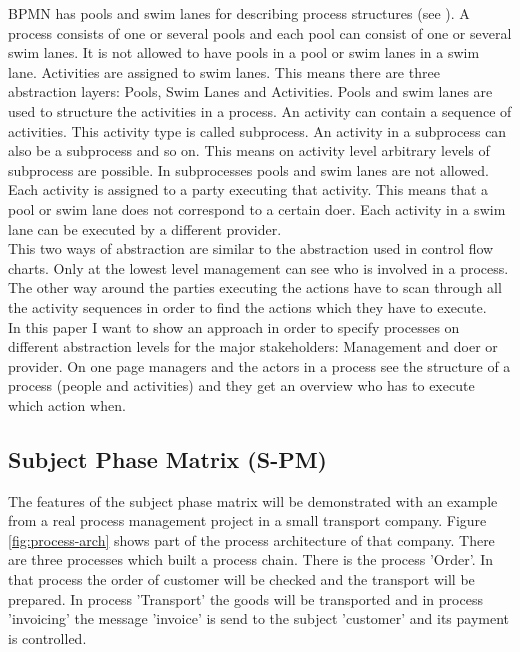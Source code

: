 BPMN has pools and swim lanes for describing process structures (see \cite{Standard:BPMN}). A process consists of one or several pools and each pool can consist of one or several swim lanes. It is not allowed to have pools in a pool or swim lanes in a swim lane. Activities are assigned to swim lanes. This means there are three abstraction layers: Pools, Swim Lanes and Activities. Pools and swim lanes are used to structure the activities in a process. An activity can contain a sequence of activities. This activity type is called subprocess. An activity in a subprocess can also be a subprocess and so on. This means on activity level arbitrary levels of subprocess are possible. In subprocesses pools and swim lanes are not allowed. Each activity is assigned to a party executing that activity. This means that a pool or swim lane does not correspond to a certain doer. Each activity in a swim lane can be executed by a different provider.\\

This two ways of abstraction are similar to the abstraction used in control flow charts. Only at the lowest level management can see who is involved in a process. The other way around the parties executing the actions have to scan through all the activity sequences in order to find the actions which they have to execute. 
\\
In this paper I want to show an approach in order to specify processes on different abstraction levels for the major stakeholders: Management and doer or provider. On one page managers and the actors in a process see the structure of a process (people and activities) and they get an overview who has to execute which action when.


\subsection{Subject Phase Matrix (S-PM)}

The features of the subject phase matrix will be demonstrated with an example from a real process management project in a small transport company. Figure \ref{fig:process-arch} shows part of the process architecture of that company. There are three processes which built a process chain. There is the process 'Order'. In that process the order of customer will be checked and the transport will be prepared. In process 'Transport' the goods will be transported and in process 'invoicing' the message 'invoice' is send to the subject 'customer' and its payment is controlled. 

